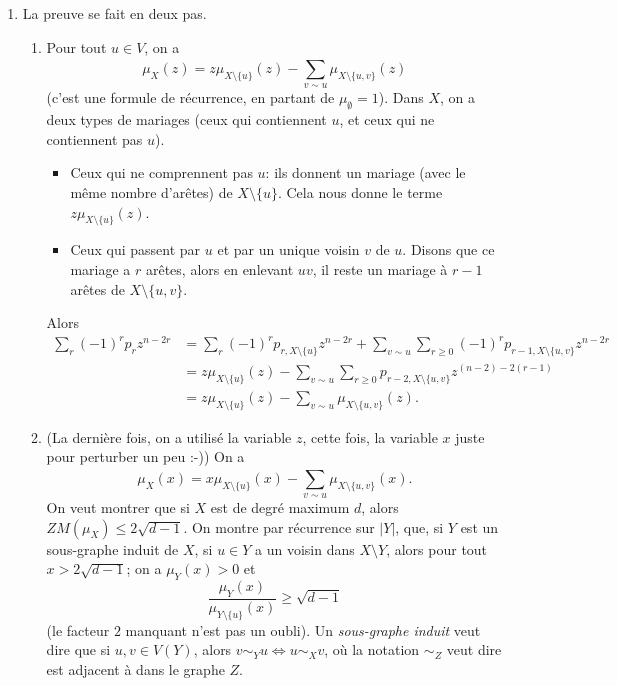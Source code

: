\begin{preuve}[de la Proposition]
\begin{enumerate}
    
  \item La preuve se fait en deux pas.
    \begin{enumerate}
    \item Pour tout $u \in V$, on a 
      \begin{equation}
        \label{eq:1}
        \mu_X(z) = z\mu_{X \setminus \{u\}}(z) - \sum_{v \sim u}^{}\mu_{X \setminus \{u, v\}}(z)
      \end{equation}
      (c'est une formule de récurrence, en partant de $\mu_\emptyset = 1$). Dans $X$, on a deux types de
      mariages (ceux qui contiennent $u$, et ceux qui ne contiennent pas $u$).
      \begin{itemize}
      \item Ceux qui ne comprennent pas $u$: ils donnent un mariage (avec le même nombre d'arêtes) de $X
        \setminus \{u\}$. Cela nous donne le terme $z \mu_{X \setminus \{u\}}(z)$.
      \item Ceux qui passent par $u$ et par un unique voisin $v$ de $u$. Disons que ce mariage a $r$ arêtes,
        alors en enlevant $uv$, il reste un mariage à $r-1$ arêtes de $X \setminus \{u, v\}$.
      \end{itemize}
      Alors 
      \begin{align*}
        \sum_{r}^{}(-1)^r p_r z^{n - 2r}
        &= \sum_{r}^{} (-1)^r p_{r, X \setminus \{u\}} z^{n - 2r} + \sum_{v
          \sim u}^{} \sum_{r \geq 0}^{} (-1)^r p_{r-1, X \setminus \{u,v\}} z^{n-2r}\\
        &= z \mu_{X \setminus \{u\}}(z) - \sum_{v \sim u}^{} \sum_{r \geq 0}^{} p_{r-2, X \setminus \{u,
          v\}}z^{(n-2)-2(r-1)}\\
        &= z \mu_{X \setminus \{u\}}(z) - \sum_{v \sim u}^{} \mu_{X \setminus \{u, v\}}(z).
      \end{align*}

    \item (La dernière fois, on a utilisé la variable $z$, cette fois, la variable $x$ juste pour perturber un
      peu :-)) On a 
      \[ \mu_X(x) = x \mu_{X \setminus \{u\}}(x) - \sum_{v \sim u}^{} \mu_{X \setminus \{u, v\}}(x). \]
      On veut montrer que si $X$ est de degré maximum $d$, alors $ZM(\mu_X) \leq 2 \sqrt{d-1}$. On montre par
      récurrence sur $|Y|$, que, si $Y$ est un sous-graphe induit de $X$, si $u \in Y$ a un voisin dans $X
      \setminus Y$, alors pour tout $x > 2\sqrt{d-1}$; on a $\mu_Y(x) > 0$ et 
      \[ \frac{\mu_Y(x)}{\mu_{Y \setminus \{u\}}(x)} \geq \sqrt{d-1} \]
      (le facteur $2$ manquant n'est pas un oubli). Un \emph{sous-graphe induit}
      veut dire que si $u, v \in V(Y)$, alors $v \sim_Y u \iff u \sim_X v$, où la notation $\sim_Z$ veut dire
      \og est adjacent à dans le graphe $Z$\fg{}.


\end{enumerate}
\end{enumerate}
\end{preuve}
